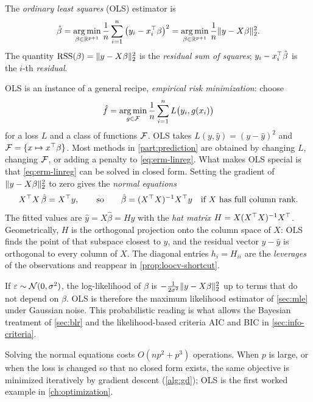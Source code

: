 \begin{definition}\label{def:ols}
The \emph{ordinary least squares} (OLS) estimator is
\[
\hat\beta=\operatorname*{arg\,min}_{\beta\in\mathbb{R}^{p+1}}\frac1n\sum_{i=1}^n\big(y_i-x_i^{\top}\beta\big)^2=\operatorname*{arg\,min}_{\beta\in\mathbb{R}^{p+1}}\frac1n\lVert y-X\beta\rVert_2^2 .
\]
The quantity $\mathrm{RSS}(\beta)=\lVert y-X\beta\rVert_2^2$ is the \emph{residual sum of squares}; $y_i-x_i^{\top}\hat\beta$ is the $i$-th \emph{residual}.
\end{definition}

OLS is an instance of a general recipe, \emph{empirical risk minimization}: choose
\begin{equation}\label{eq:erm-linreg}
\hat f=\operatorname*{arg\,min}_{g\in\mathcal{F}}\frac1n\sum_{i=1}^nL\big(y_i,g(x_i)\big)
\end{equation}
for a loss $L$ and a class of functions $\mathcal{F}$. OLS takes $L(y,\hat y)=(y-\hat y)^2$ and $\mathcal{F}=\{x\mapsto x^{\top}\beta\}$. Most methods in \cref{part:prediction} are obtained by changing $L$, changing $\mathcal{F}$, or adding a penalty to \eqref{eq:erm-linreg}. What makes OLS special is that \eqref{eq:erm-linreg} can be solved in closed form. Setting the gradient of $\lVert y-X\beta\rVert_2^2$ to zero gives the \emph{normal equations}
\[
X^{\top} X\,\hat\beta=X^{\top} y,\qquad\text{so}\qquad \hat\beta=(X^{\top} X)^{-1}X^{\top} y\quad\text{if $X$ has full column rank.}
\]
The fitted values are $\hat y=X\hat\beta=Hy$ with the \emph{hat matrix} $H=X(X^{\top} X)^{-1}X^{\top}$. Geometrically, $H$ is the orthogonal projection onto the column space of $X$: OLS finds the point of that subspace closest to $y$, and the residual vector $y-\hat y$ is orthogonal to every column of $X$. The diagonal entries $h_i=H_{ii}$ are the \emph{leverages} of the observations and reappear in \cref{prop:loocv-shortcut}.

\begin{remark}\label{rem:ols-mle}
If $\varepsilon\sim\mathcal{N}(0,\sigma^2)$, the log-likelihood of $\beta$ is $-\frac{1}{2\sigma^2}\lVert y-X\beta\rVert_2^2$ up to terms that do not depend on $\beta$. OLS is therefore the maximum likelihood estimator of \cref{sec:mle} under Gaussian noise. This probabilistic reading is what allows the Bayesian treatment of \cref{sec:blr} and the likelihood-based criteria AIC and BIC in \cref{sec:info-criteria}.
\end{remark}

\begin{remark}
Solving the normal equations costs $O(np^2+p^3)$ operations. When $p$ is large, or when the loss is changed so that no closed form exists, the same objective is minimized iteratively by gradient descent (\cref{alg:gd}); OLS is the first worked example in \cref{ch:optimization}.
\end{remark}

